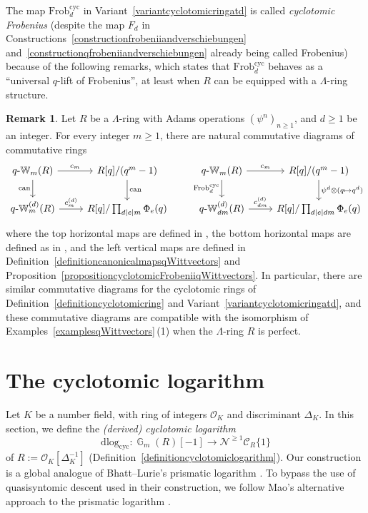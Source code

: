\documentclass[10pt,twoside]{scrarticle}
\newlength{\mar} \setlength{\mar}{1cm}%
\newlength{\len}
\theoremstyle{definition}
\newtheorem{remark}[theorem]{Remark}
\DeclareMathOperator{\G}{\mathbb{G}}
\newcommand{\nbrrg}{\mathcal{O}_K[\Delta_K^{-1}]}
\newcommand{\Frob}{\mathrm{Frob}}
\newcommand{\Cyc}{\mathrm{cyc}}
\newcommand{\qW}{q\text{-}\mathbb{W}}
\renewcommand{\ge}{\geqslant}
\newcommand{\dlog}{\mathrm{dlog}}
\numberwithin{equation}{theorem}
\begin{document}
The map $\Frob_d^{\Cyc}$ in Variant~\ref{variantcyclotomicringatd} is called \emph{cyclotomic Frobenius} (despite the map $F_d$ in Constructions~\ref{constructionfrobeniiandverschiebungen} and~\ref{constructionqfrobeniiandverschiebungen} already being called Frobenius) because of the following remarks, which states that $\Frob_d^{\Cyc}$ behaves as a ``universal $q$-lift of Frobenius'', at least when $R$ can be equipped with a $\Lambda$-ring structure.

\begin{remark}\label{remarkLambdaring}
    Let $R$ be a $\Lambda$-ring with Adams operations $(\psi^n)_{n \ge 1}$, and $d \ge 1$ be an integer. For every integer $m \ge 1$, there are natural commutative diagrams of commutative rings
    $$\begin{tikzcd}
    \qW_m(R) \arrow[r,"c_m"]\arrow[d,"\mathrm{can}"'] & R[q]/(q^m-1) \arrow[d,"\mathrm{can}"] \\ 
    \qW_{m}^{(d)}(R) \arrow[r,"c_m^{(d)}"] & R[q]/\prod_{d|e|m}{\Phi_e(q)}
    \end{tikzcd}
    \qquad 
    \begin{tikzcd}
    \qW_m(R) \arrow[r,"c_m"]\arrow[d,"\Frob^{\Cyc}_d"'] & R[q]/(q^m-1)\arrow[d,"\psi^d\otimes (q\mapsto q^d)"]\\ 
    \qW_{dm}^{(d)}(R) \arrow[r,"c_{dm}^{(d)}"] & R[q]/\prod_{d|e|dm}{\Phi_e(q)}
    \end{tikzcd}$$
    where the top horizontal maps are defined in \cite[Lemma~2.34]{wagner_q-witt_2024}, the bottom horizontal maps are defined as in \cite[Lemma~2.34]{wagner_q-witt_2024}, and the left vertical maps are defined in Definition~\ref{definitioncanonicalmapsqWittvectors} and Proposition~\ref{propositioncyclotomicFrobeniiqWittvectors}. In particular, there are similar commutative diagrams for the cyclotomic rings of Definition~\ref{definitioncyclotomicring} and Variant~\ref{variantcyclotomicringatd}, and these commutative diagrams are compatible with the isomorphism of Examples~\ref{examplesqWittvectors}\,(1) when the $\Lambda$-ring $R$ is perfect.
\end{remark}





\section{The cyclotomic logarithm}\label{sec:cyclotomic-logarithm}

Let $K$ be a number field, with ring of integers $\mathcal{O}_K$ and discriminant $\Delta_K$. In this section, we define the \emph{(derived) cyclotomic logarithm}
$$\dlog_{\Cyc} : \G_m(R)[-1] \longrightarrow \mathcal{N}^{\ge 1} \mathcal{C}_R\{1\}$$
of $R:=\nbrrg$ (Definition~\ref{definitioncyclotomiclogarithm}). Our construction is a global analogue of Bhatt--Lurie's prismatic logarithm \cite[Section~2]{bhatt_absolute_2022}. To bypass the use of quasisyntomic descent used in their construction, we follow Mao's alternative approach to the prismatic logarithm \cite[Section~2]{mao_prismatic_2024}.
\end{document}
